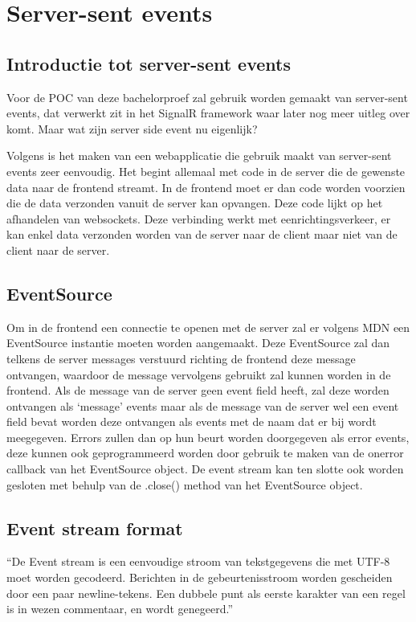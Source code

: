 \section{Server-sent events}
\subsection{Introductie tot server-sent events}
Voor de POC van deze bachelorproef zal gebruik worden gemaakt van server-sent events, dat verwerkt zit in het SignalR framework waar later nog meer uitleg over komt. Maar wat zijn server side event nu eigenlijk?

Volgens \textcite{DevMozSSE} is het maken van een webapplicatie die gebruik maakt van server-sent events zeer eenvoudig. Het begint allemaal met code in de server die de gewenste data naar de frontend streamt. In de frontend moet er dan code worden voorzien die de data verzonden vanuit de server kan opvangen. Deze code lijkt op het afhandelen van websockets. Deze verbinding werkt met eenrichtingsverkeer, er kan enkel data verzonden worden van de server naar de client maar niet van de client naar de server. 

\subsection{EventSource}
Om in de frontend een connectie te openen met de server zal er volgens MDN \textcite{DevMozSSE} een EventSource instantie moeten worden aangemaakt. Deze EventSource zal dan telkens de server messages verstuurd richting de frontend deze message ontvangen, waardoor de message vervolgens gebruikt zal kunnen worden in de frontend.
Als de message van de server geen event field heeft, zal deze worden ontvangen als ‘message’ events maar als de message van de server wel een event field bevat worden deze ontvangen als events met de naam dat er bij wordt meegegeven. Errors zullen dan op hun beurt worden doorgegeven als error events, deze kunnen ook geprogrammeerd worden door gebruik te maken van de onerror callback van het EventSource object. De event stream kan ten slotte ook worden gesloten met behulp van de .close() method van het EventSource object.

\subsection{Event stream format}
``De Event stream is een eenvoudige stroom van tekstgegevens die met UTF-8 moet worden gecodeerd. Berichten in de gebeurtenisstroom worden gescheiden door een paar newline-tekens. Een dubbele punt als eerste karakter van een regel is in wezen commentaar, en wordt genegeerd.''\autocite{DevMozSSE}

